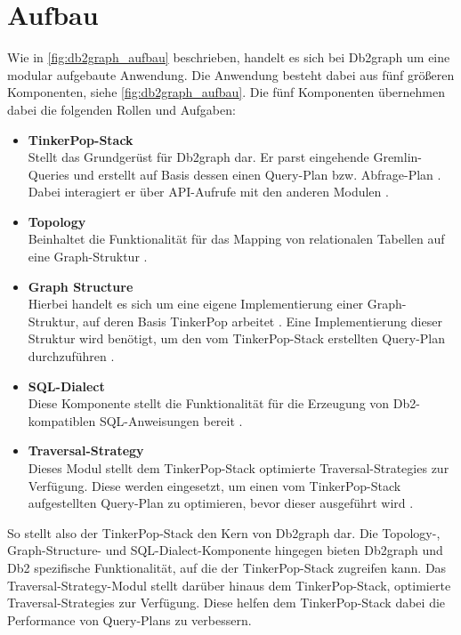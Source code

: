 \section{Aufbau}
Wie in \autoref{fig:db2graph_aufbau} beschrieben, handelt es sich bei Db2graph um eine modular aufgebaute Anwendung. Die Anwendung besteht dabei aus fünf größeren Komponenten, siehe \autoref{fig:db2graph_aufbau}. Die fünf Komponenten übernehmen dabei die folgenden Rollen und Aufgaben: 

\begin{itemize}
    \item \textbf{TinkerPop-Stack}\\Stellt das Grundgerüst für Db2graph dar. Er parst eingehende Gremlin-Queries und erstellt auf Basis dessen einen Query-Plan bzw. Abfrage-Plan \cite{vldb_tian}. Dabei interagiert er über API-Aufrufe mit den anderen Modulen \cite{vldb_tian}.
    \item \textbf{Topology}\\Beinhaltet die Funktionalität für das Mapping von relationalen Tabellen auf eine Graph-Struktur \cite{vldb_tian, sigmod_tian}.
    \item \textbf{Graph Structure}\\Hierbei handelt es sich um eine eigene Implementierung einer Graph-Struktur, auf deren Basis TinkerPop arbeitet \cite{vldb_tian}. Eine Implementierung dieser Struktur wird benötigt, um den vom TinkerPop-Stack erstellten Query-Plan durchzuführen \cite{sigmod_tian}. 
    \item \textbf{SQL-Dialect}\\Diese Komponente stellt die Funktionalität für die Erzeugung von Db2-kompatiblen SQL-Anweisungen bereit \cite{sigmod_tian}.
    \item \textbf{Traversal-Strategy}\\Dieses Modul stellt dem TinkerPop-Stack optimierte Traversal-Strategies zur Verfügung. Diese werden eingesetzt, um einen vom TinkerPop-Stack aufgestellten Query-Plan zu optimieren, bevor dieser ausgeführt wird \cite{sigmod_tian}.  
\end{itemize}

So stellt also der TinkerPop-Stack den Kern von Db2graph dar. Die Topology-, Graph-Structure- und SQL-Dialect-Komponente hingegen bieten Db2graph und Db2 spezifische Funktionalität, auf die der TinkerPop-Stack zugreifen kann. Das Traversal-Strategy-Modul stellt darüber hinaus dem TinkerPop-Stack, optimierte Traversal-Strategies zur Verfügung. Diese helfen dem TinkerPop-Stack dabei die Performance von Query-Plans zu verbessern.  

